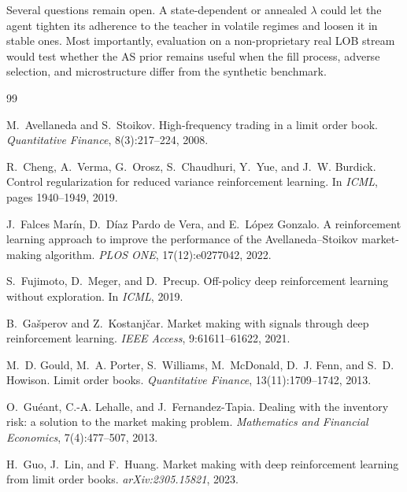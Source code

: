 \documentclass{article}
\begin{document}
Several questions remain open. A state-dependent or annealed
$\lambda$ could let the agent tighten its adherence to the teacher
in volatile regimes and loosen it in stable ones. Most importantly,
evaluation on a non-proprietary real LOB stream would test whether
the AS prior remains useful when the fill process, adverse selection,
and microstructure differ from the synthetic benchmark.



\newpage

\begin{thebibliography}{99}
\providecommand{\natexlab}[1]{#1}

M.~Avellaneda and S.~Stoikov.
\newblock High-frequency trading in a limit order book.
\newblock \emph{Quantitative Finance}, 8(3):217--224, 2008.

R.~Cheng, A.~Verma, G.~Orosz, S.~Chaudhuri, Y.~Yue, and J.~W. Burdick.
\newblock Control regularization for reduced variance reinforcement learning.
\newblock In \emph{ICML}, pages 1940--1949, 2019.

J.~Falces Mar\'in, D.~D\'iaz Pardo de Vera, and E.~L\'opez Gonzalo.
\newblock A reinforcement learning approach to improve the performance of the Avellaneda--Stoikov market-making algorithm.
\newblock \emph{PLOS ONE}, 17(12):e0277042, 2022.

S.~Fujimoto, D.~Meger, and D.~Precup.
\newblock Off-policy deep reinforcement learning without exploration.
\newblock In \emph{ICML}, 2019.

B.~Ga\v{s}perov and Z.~Kostanj\v{c}ar.
\newblock Market making with signals through deep reinforcement learning.
\newblock \emph{IEEE Access}, 9:61611--61622, 2021.

M.~D. Gould, M.~A. Porter, S.~Williams, M.~McDonald, D.~J. Fenn, and S.~D. Howison.
\newblock Limit order books.
\newblock \emph{Quantitative Finance}, 13(11):1709--1742, 2013.

O.~Gu\'eant, C.-A. Lehalle, and J.~Fernandez-Tapia.
\newblock Dealing with the inventory risk: a solution to the market making problem.
\newblock \emph{Mathematics and Financial Economics}, 7(4):477--507, 2013.

H.~Guo, J.~Lin, and F.~Huang.
\newblock Market making with deep reinforcement learning from limit order books.
\newblock \emph{arXiv:2305.15821}, 2023.


\end{thebibliography}
\end{document}
